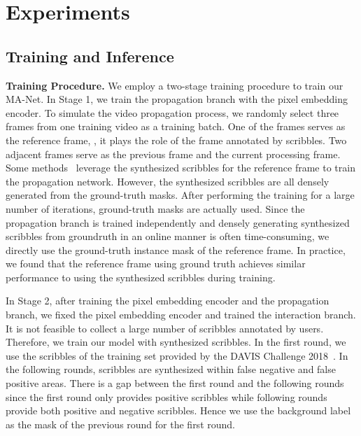 \documentclass[10pt,twocolumn,letterpaper]{article}
\begin{document}
\section{Experiments}
\subsection{Training and Inference}
\textbf{Training Procedure.}
We employ a two-stage training procedure to train our MA-Net. In Stage 1, we train the propagation branch with the pixel embedding encoder. To simulate the video propagation process, we randomly select three frames from one training video as a training batch. One of the frames serves as the reference frame, \ie, it plays the role of the frame annotated by scribbles. Two adjacent frames serve as the previous frame and the current processing frame.  Some methods~\cite{oh2019fast,DAVIS2019-Interactive-2nd} leverage the synthesized scribbles for the reference frame to train the propagation network. However, the synthesized scribbles are all densely generated from the ground-truth masks. After performing the training for a large number of iterations, ground-truth masks are actually used. Since the propagation branch is trained independently and densely generating synthesized scribbles from groundruth in an online manner is often time-consuming, we directly use the ground-truth instance mask of the reference frame. 
In practice, we found that the reference frame using ground truth achieves similar performance to using the synthesized scribbles during training.


In Stage 2, after training the pixel embedding encoder and the propagation branch, we fixed the pixel embedding encoder and trained the interaction branch. It is not feasible to collect a large number of scribbles annotated by users. Therefore, we train our model with synthesized scribbles. In the first round, we use the scribbles of the training set provided by the DAVIS Challenge 2018~\cite{caelles20182018}. In the following rounds, scribbles are synthesized within false negative and false positive areas. There is a gap between the first round and the following rounds since the first round only provides positive scribbles while following rounds provide both positive and negative scribbles. Hence we use the background label as the mask of the previous round for the first round.
\end{document}
